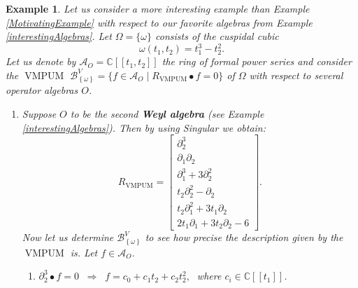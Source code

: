 \documentclass[a4paper,10pt]{article}
\newtheorem{ex}[Th]{Example}
\theoremstyle{nonumberplain}
\newcommand{\C}{\mathbb{C}}
\DeclareMathOperator{\VMPUM}{VMPUM}
\begin{document}
\begin{ex}\label{VMPUMex}
 Let us consider a more interesting example than Example \ref{MotivatingExample}
with respect to our favorite algebras from Example \ref{interestingAlgebras}.  Let $\Omega=\{\omega\}$ 
consists of the cuspidal cubic $$\omega(t_1,t_2)=t_1^3-t_2^2.$$ 
Let us denote by $\mathcal{A}_O=\C[[t_1,t_2]]$ the ring of formal power series and consider the 
$\VMPUM$ $ \mathcal{B}_{\left\lbrace \omega \right\rbrace }^V= \lbrace f \in
\mathcal{A}_O \; | \; R_{\VMPUM} \bullet f= 0 \rbrace $ of $\Omega$ with respect to several
operator algebras $O$.
\begin{enumerate}
 \item Suppose $O$ to be the second \textbf{Weyl algebra} (see Example \ref{interestingAlgebras}). Then
by using {\sc Singular} we obtain: 
$$ R_{\VMPUM} =  
\left[ \begin{array}{c} 
\partial_2^3 \\
\partial_1 \partial_2 \\
\partial_1^3 + 3 \partial_2^2 \\
t_2 \partial_2^2-\partial_2 \\
t_2 \partial_1^2 + 3 t_1 \partial_2\\
2 t_1 \partial_1+3 t_2 \partial_2-6
\end{array} \right]. $$ 
Now let us determine $\mathcal{B}_{\left\lbrace \omega \right\rbrace }^V$ to see how 
precise the description given by the $\VMPUM$ is. Let $f \in \mathcal{A}_O$.
\begin{enumerate}
\item $\partial_2^3 \bullet f = 0 \;\; \Rightarrow \;\; f=c_0 + c_1 t_2 + c_2 t_2^2, \;$ where
      $c_i \in \C[[t_1]]$.
      

\end{enumerate}
\end{enumerate}
\end{ex}
\end{document}
